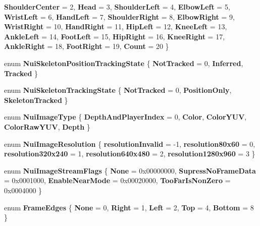 \begin{DoxyCompactItemize}
{\bfseries Shoulder\+Center} = 2, 
{\bfseries Head} = 3, 
\newline
{\bfseries Shoulder\+Left} = 4, 
{\bfseries Elbow\+Left} = 5, 
{\bfseries Wrist\+Left} = 6, 
{\bfseries Hand\+Left} = 7, 
\newline
{\bfseries Shoulder\+Right} = 8, 
{\bfseries Elbow\+Right} = 9, 
{\bfseries Wrist\+Right} = 10, 
{\bfseries Hand\+Right} = 11, 
\newline
{\bfseries Hip\+Left} = 12, 
{\bfseries Knee\+Left} = 13, 
{\bfseries Ankle\+Left} = 14, 
{\bfseries Foot\+Left} = 15, 
\newline
{\bfseries Hip\+Right} = 16, 
{\bfseries Knee\+Right} = 17, 
{\bfseries Ankle\+Right} = 18, 
{\bfseries Foot\+Right} = 19, 
\newline
{\bfseries Count} = 20
 \}
\item 
\mbox{\label{class_kinect_wrapper_a2aa1ef02e1edc9d3bcb5dc78cc41e173}} 
enum {\bfseries Nui\+Skeleton\+Position\+Tracking\+State} \{ {\bfseries Not\+Tracked} = 0, 
{\bfseries Inferred}, 
{\bfseries Tracked}
 \}
\item 
\mbox{\label{class_kinect_wrapper_a9d527d2064187b8e50453a8fa4158e49}} 
enum {\bfseries Nui\+Skeleton\+Tracking\+State} \{ {\bfseries Not\+Tracked} = 0, 
{\bfseries Position\+Only}, 
{\bfseries Skeleton\+Tracked}
 \}
\item 
\mbox{\label{class_kinect_wrapper_a0126bd0303d23d562566d2ae99927335}} 
enum {\bfseries Nui\+Image\+Type} \{ \newline
{\bfseries Depth\+And\+Player\+Index} = 0, 
{\bfseries Color}, 
{\bfseries Color\+Y\+UV}, 
{\bfseries Color\+Raw\+Y\+UV}, 
\newline
{\bfseries Depth}
 \}
\item 
\mbox{\label{class_kinect_wrapper_acef333d357f10c9b9b2e623ac4238470}} 
enum {\bfseries Nui\+Image\+Resolution} \{ \newline
{\bfseries resolution\+Invalid} = -\/1, 
{\bfseries resolution80x60} = 0, 
{\bfseries resolution320x240} = 1, 
{\bfseries resolution640x480} = 2, 
\newline
{\bfseries resolution1280x960} = 3
 \}
\item 
\mbox{\label{class_kinect_wrapper_ac51a99482e85bf5ea85af0e7e3bb25bd}} 
enum {\bfseries Nui\+Image\+Stream\+Flags} \{ {\bfseries None} = 0x00000000, 
{\bfseries Supress\+No\+Frame\+Data} = 0x0001000, 
{\bfseries Enable\+Near\+Mode} = 0x00020000, 
{\bfseries Too\+Far\+Is\+Non\+Zero} = 0x0004000
 \}
\item 
\mbox{\label{class_kinect_wrapper_a70fa40d94bc2a6e7bdfe7a07d26ee535}} 
enum {\bfseries Frame\+Edges} \{ \newline
{\bfseries None} = 0, 
{\bfseries Right} = 1, 
{\bfseries Left} = 2, 
{\bfseries Top} = 4, 
\newline
{\bfseries Bottom} = 8
 \}
\end{DoxyCompactItemize}

